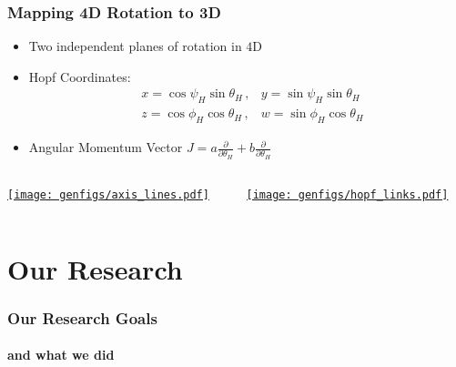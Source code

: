 \documentclass[xcolor=dvipsnames]{beamer}
\begin{document}

\begin{frame}[squeeze]
  \frametitle{Mapping 4D Rotation to 3D}
  \begin{itemize}
    \item Two independent planes of rotation in $4$D 
    \item Hopf Coordinates: 
      \begin{align*}
        &x=\cos\psi_H\sin \theta_H\,,&y=\sin \psi_H\sin \theta_H\\
        &z=\cos \phi_H\cos \theta_H\,,&w=\sin \phi_H\cos \theta_H
      \end{align*}
    \item Angular Momentum Vector $J = a\frac\partial{\partial\theta_H} + b\frac\partial{\partial\theta_H}$
  \end{itemize}
  \begin{columns}[t]
    \begin{column}{0.5\paperwidth}
      \href{https://markuspad.com/figures/axis_lines.html}{\texttt{[image: genfigs/axis\_lines.pdf]}}
    \end{column}
    \begin{column}{0.5\paperwidth}
      \href{https://markuspad.com/figures/hopf_links.html}{\texttt{[image: genfigs/hopf\_links.pdf]}}
    \end{column}
  \end{columns}
\end{frame}

\section{Our Research}

\begin{frame}
  \frametitle{Our Research Goals}
  \framesubtitle{and what we did}
\end{frame}
\end{document}
